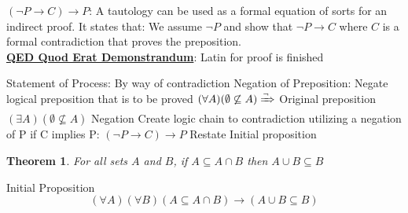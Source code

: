 \documentclass[12pt]{article}
\newtheorem{theorem}{Theorem}[section]
\newcommand{\defline}[2]{\noindent\textbf{\underline{#1}}: #2\\}
\begin{document}
            \defline{$(\neg P \rightarrow C)\rightarrow P$}{A tautology can be used as a formal equation of sorts for an indirect proof.
            It states that: We assume $\neg P$ and show that $\neg P\rightarrow C$ where $C$ is a formal contradiction that proves the preposition.}

            \defline{QED Quod Erat Demonstrandum}{Latin for proof is finished}

            \begin{outline}[enumerate]
                \1 Statement of Process: By way of contradiction
                \1 Negation of Preposition: Negate logical preposition that is to be proved
                    \2 $(\forall A)(\emptyset\not\subseteq A) \xRightarrow{\neg}$
                        \3 Original preposition
                    \2 $(\exists A)(\emptyset\not\subseteq A)$
                        \3 Negation
                \1 Create logic chain to contradiction utilizing a negation of P if C implies P: $(\neg P \rightarrow C)\rightarrow P$
                \1 Restate Initial proposition
            \end{outline}
            \begin{theorem}
                For all sets $A$ and $B$, if $A\subseteq A\cap B$ then $A\cup B \subseteq B$
            \end{theorem}

            Initial Proposition
            \begin{equation}
                (\forall A)(\forall B)(A\subseteq A\cap B)\rightarrow(A\cup B \subseteq B)
            \end{equation}
\end{document}
